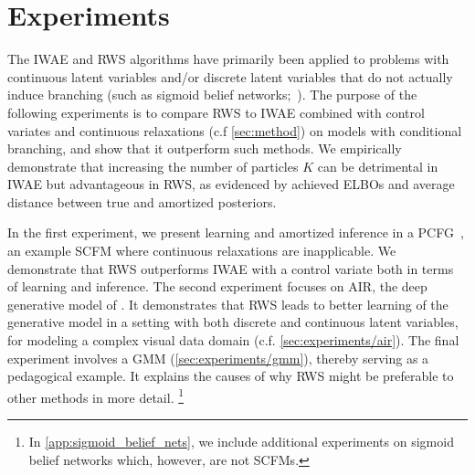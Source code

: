 
\section{Experiments}
\label{sec:experiments}


The \gls{IWAE} and \gls{RWS} algorithms have primarily been applied to problems with continuous latent variables and/or discrete latent variables that do not actually induce branching (such as sigmoid belief networks;~\cite{Neal1992connectionist}).
%
The purpose of the following experiments is to compare \gls{RWS} to \gls{IWAE} combined with control variates and continuous relaxations (c.f \cref{sec:method}) on models with conditional branching, and show that it outperform such methods.
%
We empirically demonstrate that increasing the number of particles $K$ can be detrimental in \gls{IWAE} but advantageous in \gls{RWS}, as evidenced by achieved \glspl{ELBO} and average distance between true and amortized posteriors.
%

In the first experiment, we present learning and amortized inference in a \gls{PCFG}~\citep{Booth1973applying}, an example \gls{SCFM} where continuous relaxations are inapplicable.
We demonstrate that \gls{RWS} outperforms \gls{IWAE} with a control variate both in terms of learning and inference.
The second experiment focuses on \gls{AIR}, the deep generative model of \cite{Eslami2016attend}.
It demonstrates that \gls{RWS} leads to better learning of the generative model in a setting with both discrete and continuous latent variables, for modeling a complex visual data domain (c.f. \cref{sec:experiments/air}).
The final experiment involves a \gls{GMM} (\cref{sec:experiments/gmm}), thereby serving as a pedagogical example.
It explains the causes of why \gls{RWS} might be preferable to other methods in more detail.
\footnote{In \cref{app:sigmoid_belief_nets}, we include additional experiments on sigmoid belief networks which, however, are not \glspl{SCFM}.}

